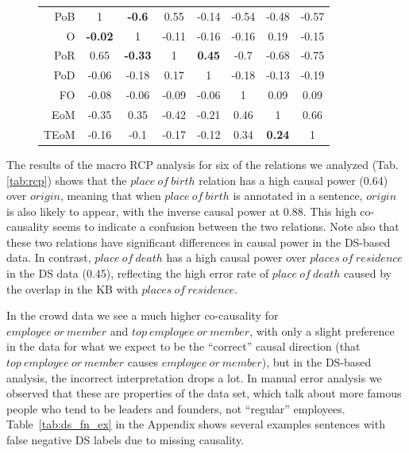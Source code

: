 \begin{table}[htb!]
\begin{subfigure}{\textwidth}
{\begin{tabular}{rccccccc}
     PoB   & 1     & \textbf{-0.6}  & 0.55  & -0.14 & -0.54 & -0.48 & -0.57 \\ 
     \cellcolor{aliceblue}O     & \cellcolor{aliceblue}\textbf{-0.02} & \cellcolor{aliceblue}1     & \cellcolor{aliceblue}-0.11 & \cellcolor{aliceblue}-0.16 & \cellcolor{aliceblue}-0.16 & \cellcolor{aliceblue}0.19  & \cellcolor{aliceblue}-0.15 \\ 
     PoR   & 0.65  & \textbf{-0.33} & 1     & \textbf{0.45}  & -0.7  & -0.68 & -0.75 \\  
     \cellcolor{aliceblue}PoD   & \cellcolor{aliceblue}-0.06 & \cellcolor{aliceblue}-0.18 & \cellcolor{aliceblue}0.17  & \cellcolor{aliceblue}1     & \cellcolor{aliceblue}-0.18 & \cellcolor{aliceblue}-0.13 & \cellcolor{aliceblue}-0.19 \\ 
     FO    & -0.08 & -0.06 & -0.09 & -0.06 & 1     & 0.09  & 0.09 \\ 
     \cellcolor{aliceblue}EoM   & \cellcolor{aliceblue}-0.35 & \cellcolor{aliceblue}0.35  & \cellcolor{aliceblue}-0.42 & \cellcolor{aliceblue}-0.21 & \cellcolor{aliceblue}0.46  & \cellcolor{aliceblue}1     & \cellcolor{aliceblue}0.66 \\ 
     TEoM  & -0.16 & -0.1  & -0.17 & -0.12 & 0.34  & \textbf{0.24}  & 1 \\ \bottomrule
    \end{tabular}
    }
\end{subfigure}
\end{table}

The results of the macro RCP analysis for six of the relations we analyzed (Tab.\ref{tab:rcp}) shows that the $place\ of\ birth$ relation has a high causal power (0.64) over $origin$, meaning that when $place\ of\ birth$ is annotated in a sentence, $origin$ is also likely to appear, with the inverse causal power at 0.88.  This high co-causality seems to indicate a confusion between the two relations. Note also that these two relations have significant differences in causal power in the DS-based data. In contrast, $place\ of\ death$ has a high causal power over $places\ of\ residence$ in the DS data (0.45), reflecting the high error rate of $place\ of\ death$ caused by the overlap in the KB with $places\ of\ residence$.

In the crowd data we see a much higher co-causality for \\ $employee\ or\ member$ and $top\ employee\ or\ member$, with only a slight preference in the data for what we expect to be the ``correct'' causal direction (that $top\ employee\ or\ member$ causes $employee\ or\ member$), but in the DS-based analysis, the incorrect interpretation drops a lot. In manual error analysis we observed that these are properties of the data set, which talk about more famous people who tend to be leaders and founders, not ``regular'' employees.  Table~\ref{tab:ds_fn_ex} in the Appendix shows several examples sentences with false negative DS labels due to missing causality.


